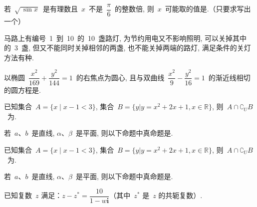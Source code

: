 \documentclass[answers]{BHCexam}
\begin{document}
\begin{questions}
\question 若~$\sqrt{\,\sin x}$~是有理数且~$x$~不是~$\dfrac{\pi}{6}$~的整数倍,
    则~$x$~可能取的值是.（只要求写出一个）

\question 马路上有编号~1~到~10~的~10~盏路灯, 为节约用电又不影响照明,
    可以关掉其中的~3~盏, 但又不能同时关掉相邻的两盏, 也不能关掉两端的路灯,
    满足条件的关灯方法有种.


\question 以椭圆~$\dfrac{x^2}{169}+\dfrac{y^2}{144}=1$~的右焦点为圆心,
    且与双曲线~$\dfrac{x^2}{9}-\dfrac{y^2}{16}=1$~的渐近线相切的圆方程是.

\newpage

\xuanze
\question 已知集合~$A=\{x\mid {x-1}<3 \}$,
集合~$B=\{y| y=x^2+2x+1,x\in\mathbb{R}\}$, 则~$A\cap
\complement_U B$~为.
\fourchoices{$[\,0,4)$}{$(-\infty,-2\,]\cup[4,+\infty)$}{$(-2,0)$}{$(0,4)$}

\question 若~$a$、$b$~是直线, $\alpha$、$\beta$~是平面,
则以下命题中真命题是.\\

\question 已知集合~$A=\{x\mid {x-1}<3 \}$,
集合~$B=\{y| y=x^2+2x+1,x\in\mathbb{R}\}$, 则~$A\cap
\complement_U B$~为.
\fourchoices{$[\,0,4)$}{$(-\infty,-2\,]\cup[4,+\infty)$}{$(-2,0)$}{$(0,4)$}

\question 若~$a$、$b$~是直线, $\alpha$、$\beta$~是平面,
则以下命题中真命题是.\\

\newpage
\jianda
\question 已知复数~$z$ 满足：${z}-z^*=\dfrac{10}{1-w\textbf{i}}$（其中~$z^*$
是~$z$ 的共轭复数）.


\end{questions}
\end{document}
